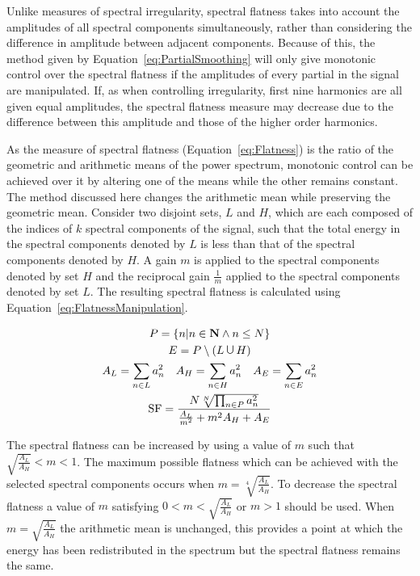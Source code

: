 		Unlike measures of spectral irregularity, spectral flatness takes into account the amplitudes of all
		spectral components simultaneously, rather than considering the difference in amplitude between adjacent
		components. Because of this, the method given by Equation~\ref{eq:PartialSmoothing} will only give
		monotonic control over the spectral flatness if the amplitudes of every partial in the signal are
		manipulated. If, as when controlling irregularity, first nine harmonics are all given equal amplitudes, the
		spectral flatness measure may decrease due to the difference between this amplitude and those of the higher
		order harmonics.

		As the measure of spectral flatness (Equation~\ref{eq:Flatness}) is the ratio of the geometric and
		arithmetic means of the power spectrum, monotonic control can be achieved over it by altering one of the
		means while the other remains constant. The method discussed here changes the arithmetic mean while
		preserving the geometric mean. Consider two disjoint sets, $L$ and $H$, which are each composed of the
		indices of $k$ spectral components of the signal, such that the total energy in the spectral components
		denoted by $L$ is less than that of the spectral components denoted by $H$. A gain $m$ is applied to the
		spectral components denoted by set $H$ and the reciprocal gain $\frac{1}{m}$ applied to the spectral
		components denoted by set $L$. The resulting spectral flatness is calculated using
		Equation~\ref{eq:FlatnessManipulation}.

		\begin{gather}
			P = \left\{ n | n \in \textbf{N} \land n \leq N \right\} \nonumber \\
			E = P \setminus (L \medcup H) \nonumber \\
			A_{L} = \sum_{n \in L} a_{n}^{2} \quad A_{H} = \sum_{n \in H} a_{n}^{2}
			   \quad A_{E} = \sum_{n \in E} a_{n}^{2} \nonumber \\
			\mathrm{SF} = \frac{N\sqrt[N]{\prod_{n \in P} a_{n}^{2}}}
					   {\frac{A_{L}}{m^{2}} + m^{2}A_{H} + A_{E}}
			\label{eq:FlatnessManipulation}
		\end{gather}

		The spectral flatness can be increased by using a value of $m$ such that $\sqrt{\frac{A_{L}}{A_{H}}} < m <
		1$. The maximum possible flatness which can be achieved with the selected spectral components occurs when
		$m = \sqrt[4]{\frac{A_{L}}{A_{H}}}$. To decrease the spectral flatness a value of $m$ satisfying $0 < m <
		\sqrt{\frac{A_{L}}{A_{H}}}$ or $m > 1$ should be used. When $m = \sqrt{\frac{A_{L}}{A_{H}}}$ the arithmetic
		mean is unchanged, this provides a point at which the energy has been redistributed in the spectrum but the
		spectral flatness remains the same. 

